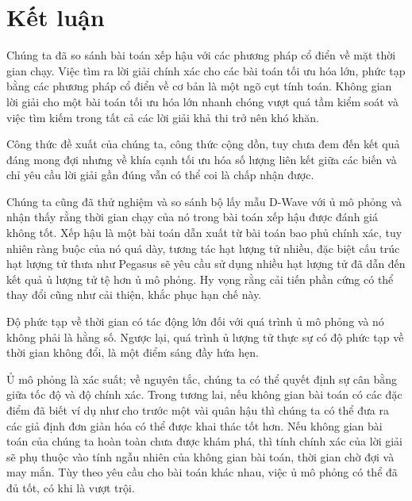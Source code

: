 

\chapter{Kết luận}
Chúng ta đã so sánh bài toán xếp hậu với các phương pháp cổ điển về mặt thời gian chạy. Việc tìm ra lời giải chính xác cho các bài toán tối ưu hóa lớn, phức tạp bằng các phương pháp cổ điển về cơ bản là một ngõ cụt tính toán. Không gian lời giải cho một bài toán tối ưu hóa lớn nhanh chóng vượt quá tầm kiểm soát và việc tìm kiếm trong tất cả các lời giải khả thi trở nên khó khăn.

Công thức đề xuất của chúng ta, công thức cộng dồn, tuy chưa đem đến kết quả đáng mong đợi nhưng về khía cạnh tối ưu hóa số lượng liên kết giữa các biến và chỉ yêu cầu lời giải gần đúng vẫn có thể coi là chấp nhận được.

Chúng ta cũng đã thử nghiệm và so sánh bộ lấy mẫu D-Wave với ủ mô phỏng và nhận thấy rằng thời gian chạy của nó trong bài toán xếp hậu được đánh giá không tốt. Xếp hậu là một bài toán dẫn xuất từ bài toán bao phủ chính xác, tuy nhiên ràng buộc của nó quá dày, tương tác hạt lượng tử nhiều, đặc biệt cấu trúc hạt lượng tử thưa như Pegasus sẽ yêu cầu sử dụng nhiều hạt lượng tử đã dẫn đến kết quả ủ lượng tử tệ hơn ủ mô phỏng. Hy vọng rằng cải tiến phần cứng có thể thay đổi cũng như cải thiện, khắc phục hạn chế này.

Độ phức tạp về thời gian có tác động lớn đối với quá trình ủ mô phỏng và nó không phải là hằng số. Ngược lại, quá trình ủ lượng tử thực sự có độ phức tạp về thời gian không đổi, là một điểm sáng đầy hứa hẹn.

Ủ mô phỏng là xác suất; về nguyên tắc, chúng ta có thể quyết định sự cân bằng giữa tốc độ và độ chính xác.
Trong tương lai, nếu không gian bài toán có các đặc điểm đã biết ví dụ như cho trước một vài quân hậu thì chúng ta có thể đưa ra các giả định đơn giản hóa có thể được khai thác tốt hơn. Nếu không gian bài toán của chúng ta hoàn toàn chưa được khám phá, thì tính chính xác của lời giải sẽ phụ thuộc vào tính ngẫu nhiên của không gian bài toán, thời gian chờ đợi và may mắn. Tùy theo yêu cầu cho bài toán khác nhau, việc ủ mô phỏng có thể đã đủ tốt, có khi là vượt trội.

